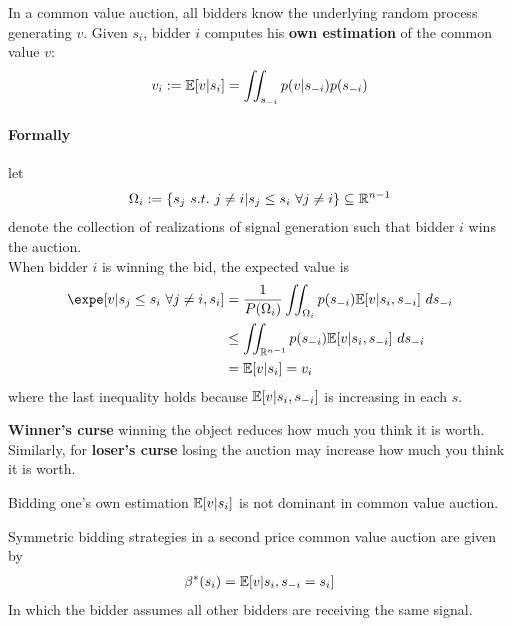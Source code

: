\documentclass{article}
\begin{document}
	\par In a common value auction, all bidders know the underlying random process generating $v$. Given $s_i$, bidder $i$ computes his \textbf{own estimation} of the common value $v$:
	\begin{align}
		v_i := \mathbb{E}[{v|s_i}] = \iint_{s_{-i}} p(v|s_{-i}) p(s_{-i})
	\end{align}
	
	\paragraph{Formally} let 
	\begin{align}
		\Omega_i := \{s_j\ s.t.\ j \neq i| s_j \leq s_i\ \forall j \neq i\} \subseteq \mathbb{R}^{n-1}
	\end{align}
	denote the collection of realizations of signal generation such that bidder $i$ wins the auction. \\
	When bidder $i$ is winning the bid, the expected value is
	\begin{align}
		\expe [v|s_j \leq s_i\ \forall j \neq i, s_i]
		&= \frac{1}{P(\Omega_i)}\iint_{\Omega_i} p(s_{-i}) \expect{v|s_i, s_{-i}}\ ds_{-i} \\
		&\leq \iint_{\R^{n-1}} p(s_{-i}) \expect{v|s_i, s_{-i}}\ ds_{-i} \\
		&= \expect{v|s_i} = v_i
	\end{align}
	where the last inequality holds because $\mathbb{E}[{v|s_i, s_{-i}}]$ is increasing in each $s$. 
	\begin{definition}
		\textbf{Winner's curse} winning the object reduces how much you think it is worth.
		Similarly, for \textbf{loser's curse} losing the auction may increase how much you think it is worth.
	\end{definition}
	
	\begin{proposition}
		Bidding one's own estimation $\mathbb{E}[{v|s_i}]$ is not dominant in common value auction.
	\end{proposition}
	
	\begin{proposition}
		Symmetric bidding strategies in a second price common value auction are given by
		\begin{align}
			\beta^*(s_i) = \mathbb{E}[{v|s_i, s_{-i} = s_i}]
		\end{align}
		In which the bidder assumes all other bidders are receiving the same signal.
	\end{proposition}
	
\end{document}
